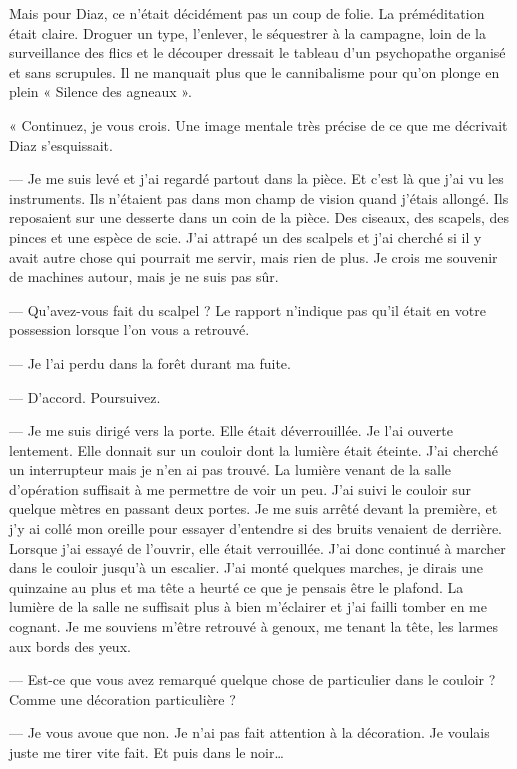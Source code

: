Mais pour Diaz, ce n'était décidément pas un coup de folie. La préméditation était claire. Droguer un type, l'enlever, 
le séquestrer à la campagne, loin de la surveillance des flics et le découper dressait le tableau d'un psychopathe 
organisé et sans scrupules. Il ne manquait plus que le cannibalisme pour qu'on plonge en plein « Silence des agneaux ».

« Continuez, je vous crois. Une image mentale très précise de ce que me décrivait Diaz s'esquissait.

— Je me suis levé et j'ai regardé partout dans la pièce. Et c'est là que j'ai vu les instruments. Ils n'étaient pas
dans mon champ de vision quand j'étais allongé. Ils reposaient sur une desserte dans un coin de la pièce. Des ciseaux,
des scapels, des pinces et une espèce de scie. J'ai attrapé un des scalpels et j'ai cherché si il y avait autre chose
qui pourrait me servir, mais rien de plus. Je crois me souvenir de machines autour, mais je ne suis pas sûr.

— Qu'avez-vous fait du scalpel ? Le rapport n'indique pas qu'il était en votre possession lorsque l'on vous a retrouvé.

— Je l'ai perdu dans la forêt durant ma fuite.

— D'accord. Poursuivez.

— Je me suis dirigé vers la porte. Elle était déverrouillée. Je l'ai ouverte lentement. Elle donnait sur un couloir
dont la lumière était éteinte. J'ai cherché un interrupteur mais je n'en ai pas trouvé. La lumière venant de la
salle d'opération suffisait à me permettre de voir un peu. J'ai suivi le couloir sur quelque mètres en passant deux
portes. Je me suis arrêté devant la première, et j'y ai collé mon oreille pour essayer d'entendre si des bruits venaient
de derrière. Lorsque j'ai essayé de l'ouvrir, elle était verrouillée. J'ai donc continué à marcher dans le couloir
jusqu'à un escalier. J'ai monté quelques marches, je dirais une quinzaine au plus et ma tête a heurté ce que je pensais
être le plafond. La lumière de la salle ne suffisait plus à bien m'éclairer et j'ai failli tomber en me cognant. Je me
souviens m'être retrouvé à genoux, me tenant la tête, les larmes aux bords des yeux.

— Est-ce que vous avez remarqué quelque chose de particulier dans le couloir ? Comme une décoration particulière ?

— Je vous avoue que non. Je n'ai pas fait attention à la décoration. Je voulais juste me tirer vite fait. Et puis dans 
le noir…


